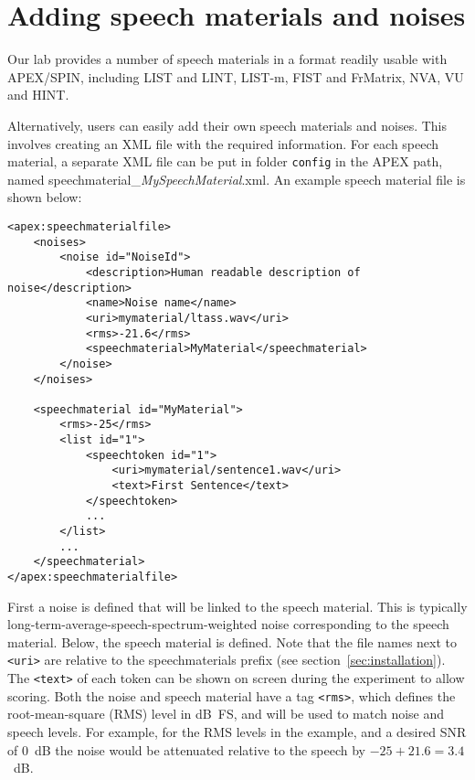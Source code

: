 \section {Adding speech materials and
noises}
\label{sec:Adding-speech-materials-and-noises}


Our lab provides a number of speech materials in a format readily usable
with APEX/SPIN, including LIST and LINT,
LIST-m, FIST and FrMatrix, NVA, VU and HINT. 

Alternatively, users can easily add their own speech materials and
noises. This involves creating an XML file with the required
information. For each speech material, a separate XML file can be put in
folder \texttt{config} in the APEX path, named
speechmaterial\_\emph{MySpeechMaterial}.xml. An example speech material
file is shown below:

\begin{lstlisting}[caption=Adding a speech material and noise]
<apex:speechmaterialfile>
    <noises>
        <noise id="NoiseId">
            <description>Human readable description of noise</description>
            <name>Noise name</name>
            <uri>mymaterial/ltass.wav</uri>
            <rms>-21.6</rms>
            <speechmaterial>MyMaterial</speechmaterial>
        </noise>
    </noises>
    
    <speechmaterial id="MyMaterial">
        <rms>-25</rms>
        <list id="1">
            <speechtoken id="1">
                <uri>mymaterial/sentence1.wav</uri>
                <text>First Sentence</text>
            </speechtoken>
            ...
        </list>
        ...
    </speechmaterial>
</apex:speechmaterialfile>
\end{lstlisting}

First a noise is defined that will be linked to the speech material.
This is typically long-term-average-speech-spectrum-weighted noise
corresponding to the speech material. Below, the speech material is
defined. Note that the file names next to \texttt{<uri>} are relative to
the speechmaterials prefix (see section~\ref{sec:installation}). The
\texttt{<text>} of each token can be shown on screen during the
experiment to allow scoring. Both the noise and speech material have a
tag \texttt{<rms>}, which defines the root-mean-square (RMS) level in
dB~FS, and will be used to match noise and speech levels. For example, for the
RMS levels in the example, and a desired SNR of 0~dB the noise would be
attenuated relative to the speech by $-25+21.6=3.4$~dB.


